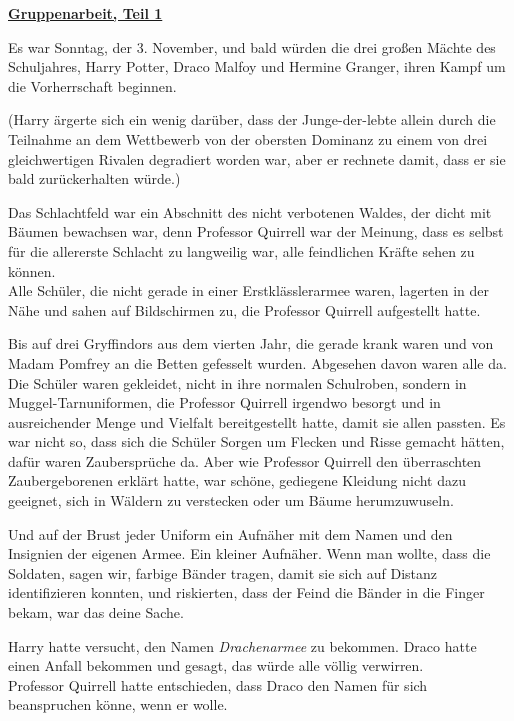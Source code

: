 

\hypertarget{gruppenarbeit-teil-1}{%

\textbf{\uline{Gruppenarbeit, Teil 1}}

\hfill\break Es war Sonntag, der 3. November, und bald würden die drei großen Mächte des Schuljahres, Harry Potter, Draco Malfoy und Hermine Granger, ihren Kampf um die Vorherrschaft beginnen.

(Harry ärgerte sich ein wenig darüber, dass der Junge-der-lebte allein durch die Teilnahme an dem Wettbewerb von der obersten Dominanz zu einem von drei gleichwertigen Rivalen degradiert worden war, aber er rechnete damit, dass er sie bald zurückerhalten würde.)

Das Schlachtfeld war ein Abschnitt des nicht verbotenen Waldes, der dicht mit Bäumen bewachsen war, denn Professor Quirrell war der Meinung, dass es selbst für die allererste Schlacht zu langweilig war, alle feindlichen Kräfte sehen zu können.\\ Alle Schüler, die nicht gerade in einer Erstklässlerarmee waren, lagerten in der Nähe und sahen auf Bildschirmen zu, die Professor Quirrell aufgestellt hatte.

Bis auf drei Gryffindors aus dem vierten Jahr, die gerade krank waren und von Madam Pomfrey an die Betten gefesselt wurden. Abgesehen davon waren alle da. Die Schüler waren gekleidet, nicht in ihre normalen Schulroben, sondern in Muggel-Tarnuniformen, die Professor Quirrell irgendwo besorgt und in ausreichender Menge und Vielfalt bereitgestellt hatte, damit sie allen passten. Es war nicht so, dass sich die Schüler Sorgen um Flecken und Risse gemacht hätten, dafür waren Zaubersprüche da. Aber wie Professor Quirrell den überraschten Zaubergeborenen erklärt hatte, war schöne, gediegene Kleidung nicht dazu geeignet, sich in Wäldern zu verstecken oder um Bäume herumzuwuseln.

Und auf der Brust jeder Uniform ein Aufnäher mit dem Namen und den Insignien der eigenen Armee. Ein kleiner Aufnäher. Wenn man wollte, dass die Soldaten, sagen wir, farbige Bänder tragen, damit sie sich auf Distanz identifizieren konnten, und riskierten, dass der Feind die Bänder in die Finger bekam, war das deine Sache.

Harry hatte versucht, den Namen \emph{Drachenarmee} zu bekommen. Draco hatte einen Anfall bekommen und gesagt, das würde alle völlig verwirren.\\ Professor Quirrell hatte entschieden, dass Draco den Namen für sich beanspruchen könne, wenn er wolle.

}
